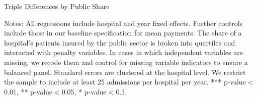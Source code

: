 \documentclass[12pt]{article}
\begin{document}
\newpage
{}
\setlength{\captionmargin}{.5 \textwidth} \addtolength{\captionmargin}{-.5\wd\gfxbox}
\begin{table}[!h]
\centering
\caption{Triple Differences by Public Share}
\label{tab:publicshare}
\usebox{\gfxbox}
\par
\begin{minipage}{\wd\gfxbox}
\footnotesize
Notes: All regressions include hospital and year fixed effects.  Further controls include those in our baseline specification for mean payments.  The share of a hospital's patients insured by the public sector is broken into quartiles and interacted with penalty variables.  In cases in which independent variables are missing, we recode them and control for missing variable indicators to ensure a balanced panel.  Standard errors are clustered at the hospital level.  We restrict the sample to include at least 25 admissions per hospital per year.  *** p-value$<$0.01, ** p-value$<$0.05, * p-value$<$0.1.
\end{minipage}
\end{table}
\end{document}
